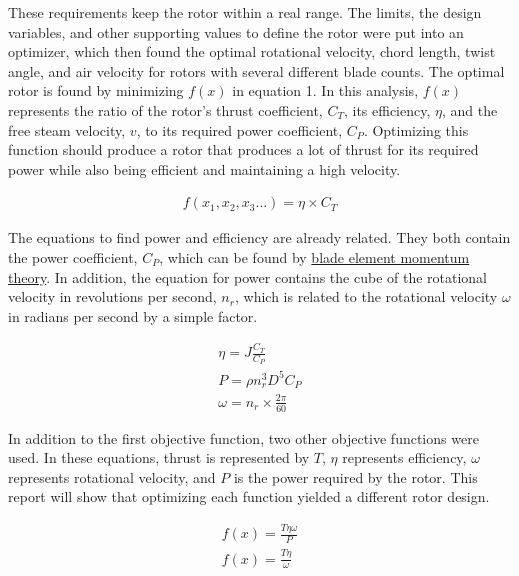 \documentclass{article}
\begin{document}
These requirements keep the rotor within a real range. The limits, the design variables, and other supporting values to define the rotor were put into an optimizer, which then found the optimal rotational velocity, chord length, twist angle, and air velocity for rotors with several different blade counts. The optimal rotor is found by minimizing $f(x)$ in equation 1. In this analysis, $f(x)$ represents the ratio of the rotor's thrust coefficient, $C_{T}$, its efficiency, $\eta$, and the free steam velocity, $v$, to its required power coefficient, $C_{P}$. Optimizing this function should produce a rotor that produces a lot of thrust for its required power while also being efficient and maintaining a high velocity. \newline

\begin{equation}
\begin{aligned}
	f(x_{1}, x_{2}, x_{3}...) = \eta \times C_{T}
\end{aligned}
\end{equation} 
\newline

The equations to find power and efficiency are already related. They both contain the power coefficient, $C_{P}$, which can be found by \hyperlink{BEM}{blade element momentum theory}. In addition, the equation for power contains the cube of the rotational velocity in revolutions per second, $n_{r}$, which is related to the rotational velocity $\omega$ in radians per second by a simple factor. \newline

\begin{equation}
\begin{aligned}
	\eta = J \frac{C_{T}}{C_{P}} \\
	P = \rho n_{r}^{3} D^{5} C_{P} \\
	\omega = n_{r} \times \frac{2 \pi}{60}
\end{aligned}
\end{equation}

In addition to the first objective function, two other objective functions were used. In these equations, thrust is represented by $T$, $\eta$ represents efficiency, $\omega$ represents rotational velocity, and $P$ is the power required by the rotor. This report will show that optimizing each function yielded a different rotor design. 

\begin{equation}
\begin{aligned}
	f(x) = \frac{T \eta \omega}{P}  \\
	f(x) = \frac{T \eta}{\omega}
\end{aligned}
\end{equation}
\end{document}
